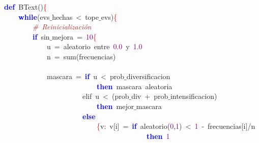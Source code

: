 \noindent
\mbox{}\textbf{\textcolor{Blue}{def}}\ BText\textcolor{BrickRed}{()}\textcolor{Red}{\{} \\
\mbox{}\ \ \ \ \textbf{\textcolor{Blue}{while}}\textcolor{BrickRed}{(}evs$\_$hechas\ \textcolor{BrickRed}{\textless{}}\ tope$\_$evs\textcolor{BrickRed}{)}\textcolor{Red}{\{} \\
\mbox{}\ \ \ \ \ \ \ \ \textit{\textcolor{Brown}{\#\ Reinicialización}} \\
\mbox{}\ \ \ \ \ \ \ \ \textbf{\textcolor{Blue}{if}}\ sin$\_$mejora\ \textcolor{BrickRed}{=}\ \textcolor{Purple}{10}\textcolor{Red}{\{} \\
\mbox{}\ \ \ \ \ \ \ \ \ \ \ \ u\ \textcolor{BrickRed}{=}\ aleatorio\ entre\ \textcolor{Purple}{0.0}\ y\ \textcolor{Purple}{1.0} \\
\mbox{}\ \ \ \ \ \ \ \ \ \ \ \ n\ \textcolor{BrickRed}{=}\ sum\textcolor{BrickRed}{(}frecuencias\textcolor{BrickRed}{)} \\
\mbox{} \\
\mbox{}\ \ \ \ \ \ \ \ \ \ \ \ mascara\ \textcolor{BrickRed}{=}\ \textbf{\textcolor{Blue}{if}}\ u\ \textcolor{BrickRed}{\textless{}}\ prob$\_$diversificacion \\
\mbox{}\ \ \ \ \ \ \ \ \ \ \ \ \ \ \ \ \ \ \ \ \ \ \ \ \ \ \textbf{\textcolor{Blue}{then}}\ mascara\ aleatoria \\
\mbox{}\ \ \ \ \ \ \ \ \ \ \ \ \ \ \ \ \ \ \ \ \ \ elif\ u\ \textcolor{BrickRed}{\textless{}}\ \textcolor{BrickRed}{(}prob$\_$div\ \textcolor{BrickRed}{+}\ prob$\_$intensificacion\textcolor{BrickRed}{)} \\
\mbox{}\ \ \ \ \ \ \ \ \ \ \ \ \ \ \ \ \ \ \ \ \ \ \ \ \ \ \textbf{\textcolor{Blue}{then}}\ mejor$\_$mascara \\
\mbox{}\ \ \ \ \ \ \ \ \ \ \ \ \ \ \ \ \ \ \ \ \ \ \textbf{\textcolor{Blue}{else}} \\
\mbox{}\ \ \ \ \ \ \ \ \ \ \ \ \ \ \ \ \ \ \ \ \ \ \ \ \ \ \textcolor{Red}{\{}v\textcolor{BrickRed}{:}\ v\textcolor{BrickRed}{[}i\textcolor{BrickRed}{]}\ \textcolor{BrickRed}{=}\ \textbf{\textcolor{Blue}{if}}\ aleatorio\textcolor{BrickRed}{(}\textcolor{Purple}{0}\textcolor{BrickRed}{,}\textcolor{Purple}{1}\textcolor{BrickRed}{)}\ \textcolor{BrickRed}{\textless{}}\ \textcolor{Purple}{1}\ \textcolor{BrickRed}{-}\ frecuencias\textcolor{BrickRed}{[}i\textcolor{BrickRed}{]/}n \\
\mbox{}\ \ \ \ \ \ \ \ \ \ \ \ \ \ \ \ \ \ \ \ \ \ \ \ \ \ \ \ \ \ \ \ \ \ \ \ \ \ \ \ \textbf{\textcolor{Blue}{then}}\ \textcolor{Purple}{1} \\
